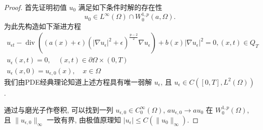 \documentclass[oneside,longtitle]{LZUthesis}
\theoremstyle{definition}
\numberwithin{equation}{chapter}
\newcommand*\abs[1]{\lvert#1\rvert}
\newcommand*\norm[1]{\lVert#1\rVert}
\DeclareMathOperator{\Div}{div}
\begin{document}
\begin{proof}
	首先证明初值 $u_0$ 满足如下条件时解的存在性
	\begin{equation}\label{initial_data_condition_tmp}
		u_0 \in L^{\infty}(\Omega) \cap W_0^{1, p}(a, \Omega).
	\end{equation}
	为此先构造如下渐进方程
	\begin{gather}
		u_{\epsilon t}-\Div\left((a(x)+\epsilon)
		\left(\left|\nabla u_{\epsilon}\right|^{2}+\epsilon\right)^{\frac{p-2}{2}} \nabla u_{\epsilon}\right)
		+b(x)\left|\nabla u_{\epsilon}\right|^{2} = 0,(x, t) \in Q_{T} \label{eq:approximated_maineq} \\
		u_{\epsilon}(x, t)  = 0, \quad(x, t) \in \partial \Omega \times(0, T)\\
		u_{\epsilon}(x, 0)  = u_{\epsilon, 0}(x), \quad x \in \Omega
	\end{gather}
	我们由PDE经典理论知道上述方程具有唯一弱解 $u_\epsilon$, 且 $u_\epsilon \in C([0, T], L^2(\Omega))$.

	通过与磨光子作卷积,
	可以找到一列 $u_{\epsilon,0} \in C_0^\infty(\Omega) $, $au_{\epsilon,0} \to au_0 $ 在 $W_0^{1,p}(\Omega) $,
	且 $\norm{u_{\epsilon, 0}}_{\infty}$ 一致有界,
	由极值原理知 $\abs{u_{\epsilon}} \leq C(\norm{u_0}_{\infty})$.


\end{proof}
\end{document}
